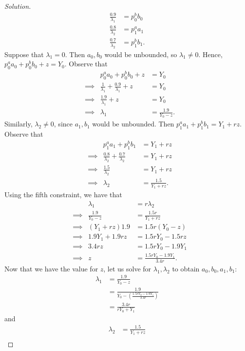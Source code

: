 \documentclass[12pt]{article}
\theoremstyle{definition}
\theoremstyle{remark}
\def\la{\lambda}
\begin{document}
\begin{proof}[Solution]
\begin{align*}
    \frac{0.9}{\la_1} &= p_0^bb_0 \\
    \frac{0.8}{\la_2} &= p_1^aa_1 \\
    \frac{0.7}{\la_2} &= p_1^bb_1.
  \end{align*}
  Suppose that $\la_1 = 0$. Then $a_0, b_0$ would be unbounded, so $\la_1 \neq 0$. Hence, $p_0^aa_0 + p_0^bb_0 + z = Y_0$.
  Observe that
  \begin{align*}
    &          & p_0^aa_0 + p_0^bb_0 + z &= Y_0 \\
    & \implies & \frac{1}{\la_1} + \frac{0.9}{\la_1} + z &= Y_0 \\
    & \implies & \frac{1.9}{\la_1} + z &= Y_0 \\
    & \implies & \la_1 &= \frac{1.9}{Y_0 - z}.
  \end{align*}
  Similarly, $\la_2 \neq 0$, since $a_1, b_1$ would be unbounded. Then $p_1^aa_1 + p_1^bb_1 = Y_1 + rz$. Observe that
  \begin{align*}
    &          & p_1^aa_1 + p_1^bb_1 &= Y_1 + rz \\
    & \implies & \frac{0.8}{\la_2} + \frac{0.7}{\la_2} &= Y_1 + rz \\
    & \implies & \frac{1.5}{\la_2} &= Y_1 + rz \\
    & \implies & \la_2 &= \frac{1.5}{Y_1 + rz}.
  \end{align*}
  Using the fifth constraint, we have that
  \begin{align*}
    &          & \la_1 &= r\la_2 \\
    & \implies & \frac{1.9}{Y_0 - z} &= \frac{1.5r}{Y_1 + rz} \\
    & \implies & (Y_1 + rz)1.9 &= 1.5r(Y_0 - z) \\
    & \implies & 1.9Y_1 + 1.9rz &= 1.5rY_0 - 1.5rz \\
    & \implies & 3.4rz &= 1.5rY_0 - 1.9Y_1 \\
    & \implies & z &= \frac{1.5rY_0 - 1.9Y_1}{3.4r}.
  \end{align*}
  Now that we have the value for $z$, let us solve for $\la_1, \la_2$ to obtain $a_0, b_0, a_1, b_1$:
  \begin{align*}
    \la_1 &= \frac{1.9}{Y_0 - z} \\
    &= \frac{1.9}{Y_0 - \left( \frac{1.5rY_0 - 1.9Y_1}{3.4r} \right)} \\
    &= \frac{3.4r}{rY_0 + Y_1}
  \end{align*}
  and
  \begin{align*}
    \la_2 &= \frac{1.5}{Y_1 + rz} \\

\end{align*}
\end{proof}
\end{document}
